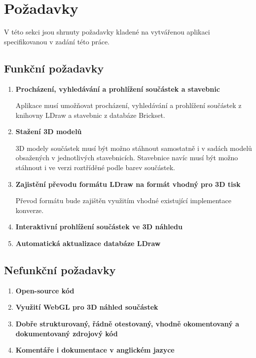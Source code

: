 \section{Požadavky}
V této sekci jsou shrnuty požadavky kladené na vytvářenou aplikaci specifikovanou v zadání této práce.

\subsection{Funkční požadavky}

\begin{enumerate}[label=FP-\arabic*:]
    \item \label{fp:model:search} \textbf{Procházení, vyhledávání a prohlížení součástek a stavebnic}

    Aplikace musí umožňovat procházení, vyhledávání a prohlížení součástek z knihovny LDraw a stavebnic z databáze Brickset. 

    \item \label{fp:model:download} \textbf{Stažení 3D modelů}

    3D modely součástek musí být možno stáhnout samostatně i v sadách modelů obsažených v jednotlivých stavebnicích. Stavebnice navíc musí být možno stáhnout i ve verzi roztříděné podle barev součástek.

    \item \label{fp:model:prevod} \textbf{Zajistění převodu formátu LDraw na formát vhodný pro 3D tisk}

    Převod formátu bude zajištěn využitím vhodné existující implementace konverze. 

    \item \label{fp:model:3Dview} \textbf{Interaktivní prohlížení součástek ve 3D náhledu}
    \item \label{fp:model:update} \textbf{Automatická aktualizace databáze LDraw}

\end{enumerate}

\subsection{Nefunkční požadavky}

\begin{enumerate}[label=NP-\arabic*:,resume]
    \item \label{np:opensource} \textbf{Open-source kód}
    \item \label{np:webgl} \textbf{Využití WebGL pro 3D náhled součástek}
    \item \label{np:structure} \textbf{Dobře strukturovaný, řádně otestovaný, vhodně okomentovaný a dokumentovaný zdrojový kód}
    \item \label{np:english} \textbf{Komentáře i dokumentace v anglickém jazyce}
\end{enumerate}